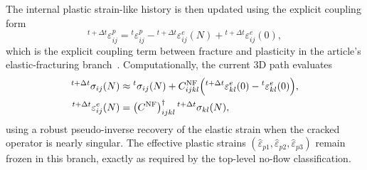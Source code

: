 The internal plastic strain-like history is then updated using the explicit
coupling form
\begin{equation}
  {}^{t+\Delta t}\!\varepsilon^{p}_{ij}
  =
  {}^{t}\!\varepsilon^{p}_{ij}
  -
  {}^{t+\Delta t}\!\varepsilon^{e}_{ij}(N)
  +
  {}^{t+\Delta t}\!\varepsilon^{e}_{ij}(0),
  \label{eq:kb-26b-audit}
\end{equation}
which is the explicit coupling term between fracture and plasticity in the
article's elastic-fracturing branch~\cite{KoBathe2026}.  Computationally, the
current 3D path evaluates
\begin{align}
  {}^{t+\Delta t}\sigma_{ij}(N)
  &\approx
  {}^{t}\sigma_{ij}(N)
  +
  C_{ijkl}^{\mathrm{NF}}
  \Bigl(
    {}^{t+\Delta t}\varepsilon_{kl}^{e}(0)
    -
    {}^{t}\varepsilon_{kl}^{e}(0)
  \Bigr),
  \\
  {}^{t+\Delta t}\varepsilon_{ij}^{e}(N)
  &=
  \bigl(C^{\mathrm{NF}}\bigr)^{\dagger}_{ijkl}
  \,
  {}^{t+\Delta t}\sigma_{kl}(N),
\end{align}
using a robust pseudo-inverse recovery of the elastic strain when the cracked
operator is nearly singular.  The effective plastic strains
\((\hat\varepsilon_{p1},\hat\varepsilon_{p2},\hat\varepsilon_{p3})\) remain
frozen in this branch, exactly as required by the top-level no-flow
classification.

